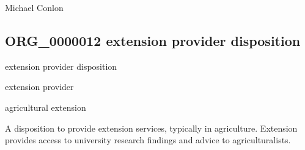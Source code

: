 \documentclass[letterpaper,10pt,english]{sphinxmanual}
\begin{document}
\begin{sphinxShadowBox}

\sphinxAtStartPar
Michael Conlon 
\end{sphinxShadowBox}
\begin{quote}

\ignorespaces \end{quote}


\subsection{ORG\_0000012 \sphinxhyphen{} extension provider disposition}
\label{\detokenize{doc-ORG_0000012:org-0000012-extension-provider-disposition}}\label{\detokenize{doc-ORG_0000012:index-0}}\label{\detokenize{doc-ORG_0000012::doc}}
\begin{sphinxShadowBox}

\sphinxAtStartPar
extension provider disposition
\end{sphinxShadowBox}

\begin{sphinxShadowBox}

\sphinxAtStartPar
extension provider
\end{sphinxShadowBox}

\begin{sphinxShadowBox}

\sphinxAtStartPar
agricultural extension
\end{sphinxShadowBox}

\begin{sphinxShadowBox}

\sphinxAtStartPar
{\hyperref[\detokenize{doc-BFO_0000016::doc}]{}}
\end{sphinxShadowBox}

\begin{sphinxShadowBox}

\sphinxAtStartPar
A disposition to provide extension services, typically in agriculture.  Extension provides access to university research findings and advice to agriculturalists.
\end{sphinxShadowBox}
\end{document}
